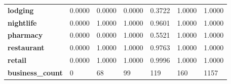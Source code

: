 \documentclass{article}
\begin{document}
\begin{table}[H]
\begin{center}
\begin{tabular}{lllllll}
\textbf{lodging}                             & 0.0000        & 0.0000           & 0.0000          & 0.3722        & 1.0000           & 1.0000       \\
\textbf{nightlife}       & 0.0000        & 1.0000           & 1.0000          & 0.9601        & 1.0000           & 1.0000        \\
\textbf{pharmacy}        & 0.0000        & 0.0000           & 1.0000          & 0.5521        & 1.0000           & 1.0000        \\
\textbf{restaurant}      & 0.0000        & 1.0000           & 1.0000          & 0.9763        & 1.0000           & 1.0000        \\
\textbf{retail}          & 0.0000        & 1.0000           & 1.0000          & 0.9996        & 1.0000           & 1.0000        \\
\textbf{business\_count} & 0             & 68               & 99              & 119           & 160              & 1157          
\end{tabular}
\end{center}
\end{table}
\end{document}
